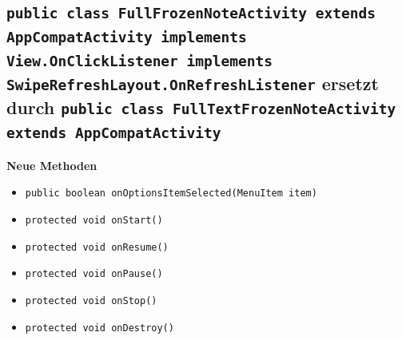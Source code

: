 \documentclass[a4paper]{scrreprt}
\begin{document}
	\subsection{\texttt{public class FullFrozenNoteActivity extends AppCompatActivity implements View.OnClickListener implements SwipeRefreshLayout.OnRefreshListener} ersetzt durch \texttt{public class FullTextFrozenNoteActivity extends AppCompatActivity}}
		\textbf{Neue Methoden}
		\begin{itemize}
			\item \texttt{public boolean onOptionsItemSelected(MenuItem item)}
			\item \texttt{protected void onStart()}
			\item \texttt{protected void onResume()}
			\item \texttt{protected void onPause()}
			\item \texttt{protected void onStop()}
			\item \texttt{protected void onDestroy()}
		\end{itemize}
			
\end{document}
